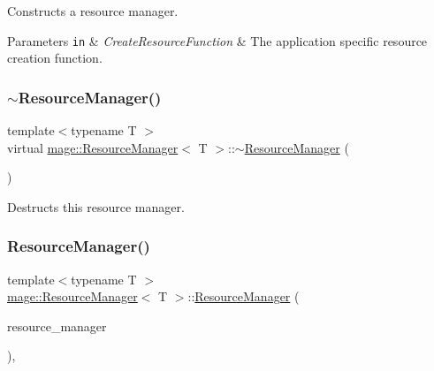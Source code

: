 Constructs a resource manager.


\begin{DoxyParams}[1]{Parameters}
\mbox{\tt in}  & {\em Create\+Resource\+Function} & The application specific resource creation function. \\
\hline
\end{DoxyParams}
\hypertarget{classmage_1_1_resource_manager_af3b6bf56e57bd3df0eb569510dd1483b}{}\label{classmage_1_1_resource_manager_af3b6bf56e57bd3df0eb569510dd1483b} 
\subsubsection{\texorpdfstring{$\sim$\+Resource\+Manager()}{~ResourceManager()}}
{\footnotesize\ttfamily template$<$typename T $>$ \\
virtual \hyperlink{classmage_1_1_resource_manager}{mage\+::\+Resource\+Manager}$<$ T $>$\+::$\sim$\hyperlink{classmage_1_1_resource_manager}{Resource\+Manager} (\begin{DoxyParamCaption}{ }\end{DoxyParamCaption})\hspace{0.3cm}{\ttfamily [virtual]}}

Destructs this resource manager. \hypertarget{classmage_1_1_resource_manager_a3b424e1ef7f543a2705d1124018d9921}{}\label{classmage_1_1_resource_manager_a3b424e1ef7f543a2705d1124018d9921} 
\subsubsection{\texorpdfstring{Resource\+Manager()}{ResourceManager()}\hspace{0.1cm}{\footnotesize\ttfamily [2/2]}}
{\footnotesize\ttfamily template$<$typename T $>$ \\
\hyperlink{classmage_1_1_resource_manager}{mage\+::\+Resource\+Manager}$<$ T $>$\+::\hyperlink{classmage_1_1_resource_manager}{Resource\+Manager} (\begin{DoxyParamCaption}\item[{const \hyperlink{classmage_1_1_resource_manager}{Resource\+Manager}$<$ T $>$ \&}]{resource\+\_\+manager }\end{DoxyParamCaption})\hspace{0.3cm}{\ttfamily [private]}, {\ttfamily [delete]}}

